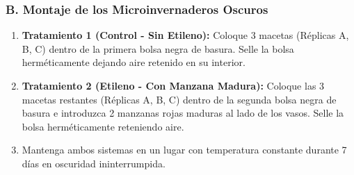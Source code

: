 \documentclass[
  spanish,
  10pt,
  letterpaper,
  twocolumn]{article}
\providecommand{\tightlist}{%
  \setlength{\itemsep}{0pt}\setlength{\parskip}{0pt}}
\begin{document}
\subsubsection{B. Montaje de los Microinvernaderos
Oscuros}\label{b.-montaje-de-los-microinvernaderos-oscuros}

\begin{enumerate}
\def\labelenumi{\arabic{enumi}.}
\tightlist
\item
  \textbf{Tratamiento 1 (Control - Sin Etileno):} Coloque 3 macetas
  (Réplicas A, B, C) dentro de la primera bolsa negra de basura. Selle
  la bolsa herméticamente dejando aire retenido en su interior.
\item
  \textbf{Tratamiento 2 (Etileno - Con Manzana Madura):} Coloque las 3
  macetas restantes (Réplicas A, B, C) dentro de la segunda bolsa negra
  de basura e introduzca 2 manzanas rojas maduras al lado de los vasos.
  Selle la bolsa herméticamente reteniendo aire.
\item
  Mantenga ambos sistemas en un lugar con temperatura constante durante
  7 días en oscuridad ininterrumpida.
\end{enumerate}
\end{document}

